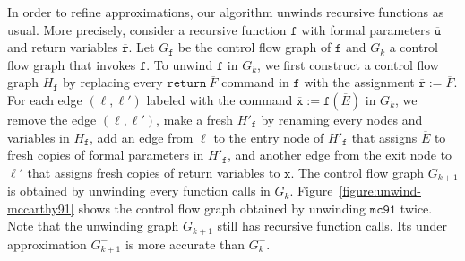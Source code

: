 In order to refine approximations, our algorithm unwinds recursive
functions as usual. More precisely, consider a recursive function
$\mathtt{f}$ with formal parameters $\overline{\mathtt{u}}$ and return variables $\overline{\mathtt{r}}$. Let
$G_{\mathtt{f}}$ be  
the control flow graph of $\mathtt{f}$ and $G_k$ a control flow graph
that invokes $\mathtt{f}$. To unwind $\mathtt{f}$ in $G_k$, 
we first construct a control flow graph $H_{\mathtt{f}}$ by 
replacing every $\mathtt{return}\ \overline{F}$ command in
$\mathtt{f}$ with the assignment $\mathtt{\overline{r}} :=
\overline{F}$. For each edge $(\ell,  
\ell')$ labeled with the command $\overline{\mathtt{x}} :=
\mathtt{f}(\overline{E})$ in $G_k$, we remove 
the edge $(\ell, \ell')$, make a fresh $H'_{\mathtt{f}}$ by
renaming every nodes and variables in $H_{\mathtt{f}}$, add an edge
from $\ell$ to the entry node of $H'_{\mathtt{f}}$ that assigns
$\overline{E}$ to fresh copies of formal parameters in 
$H'_{\mathtt{f}}$, and another edge from the exit node to $\ell'$ that
assigns fresh copies of return variables to
$\overline{\mathtt{x}}$. The control flow graph $G_{k+1}$ 
is obtained by unwinding every function calls in $G_k$. 
Figure~\ref{figure:unwind-mccarthy91} shows the control flow graph
obtained by unwinding $\mathtt{mc91}$ twice. Note that the
unwinding graph $G_{k+1}$ still has recursive function calls. Its
under approximation $G^-_{k+1}$ is more accurate than $G^-_k$.

